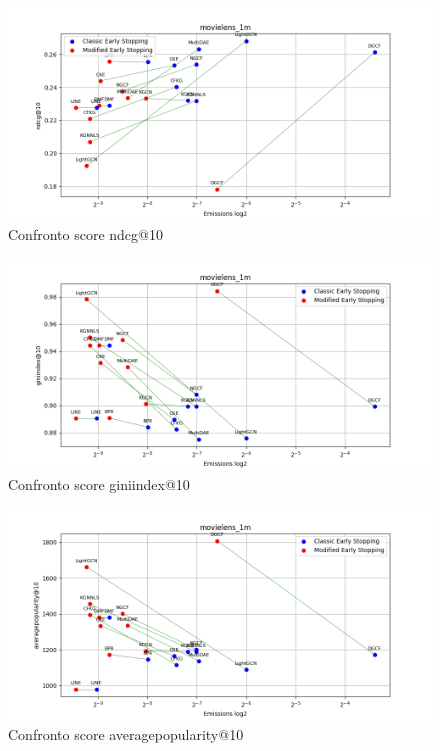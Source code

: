 \begin{figure}[H]
    \centering
    \includegraphics[width=\linewidth, trim=0 0 0 0]{images/ndcg@10_movielens_1m_40_5_comparison.png}
    \caption{Confronto score ndcg@10}
    
\end{figure}

\begin{figure}[H]
    \centering
    \includegraphics[width=\linewidth, trim=0 0 0 0]{images/giniindex@10_movielens_1m_40_5_comparison.png}
    \caption{Confronto score giniindex@10}
\end{figure}

\begin{figure}[H]
    \centering
    \includegraphics[width=\linewidth, trim=0 0 0 0]{images/averagepopularity@10_movielens_1m_40_5_comparison.png}
    \caption{Confronto score averagepopularity@10}
\end{figure}

